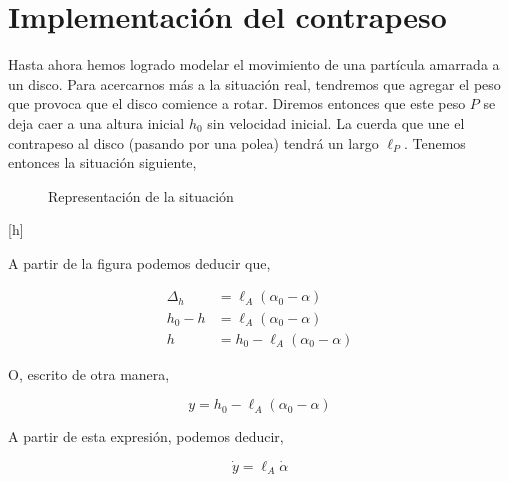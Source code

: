 \documentclass[10pt]{article}
\begin{document}
\section{Implementación del contrapeso}

Hasta ahora hemos logrado modelar el movimiento de una partícula amarrada a un disco. Para acercarnos más a la situación real, tendremos que agregar
el peso que provoca que el disco comience a rotar. Diremos entonces que este peso $P$ se deja caer a una altura inicial $h_0$ sin velocidad inicial. La
cuerda que une el contrapeso al disco (pasando por una polea) tendrá un largo $\ell_P$. Tenemos entonces la situación siguiente,

\begin{figure}[h]
\centering
{}
\caption{Representación de la situación}
\end{figure}[h]

A partir de la figura podemos deducir que,

\begin{align*}
 \Delta_h &= \ell_A(\alpha_0-\alpha) \\
 h_0-h &= \ell_A(\alpha_0-\alpha) \\
 h &= h_0-\ell_A(\alpha_0-\alpha)
\end{align*}

O, escrito de otra manera,

\begin{equation}
 y = h_0 - \ell_A(\alpha_0-\alpha)
\end{equation}

A partir de esta expresión, podemos deducir,

\begin{equation*}
 \dot{y} = \ell_A\dot{\alpha}
\end{equation*}
\end{document}

